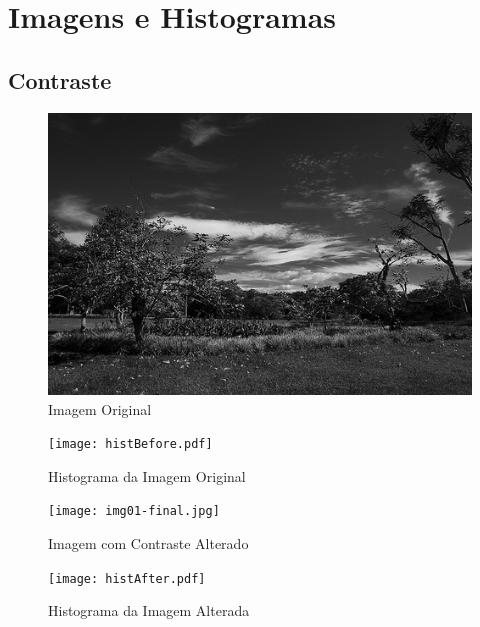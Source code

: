 \documentclass[11pt,a4paper]{article}
\begin{document}
\section{Imagens e Histogramas}
\subsection{Contraste}
\begin{figure}[!ht]
    \centering
    \includegraphics[scale=0.3]{img01.jpg}
    \caption{Imagem Original}
    \label{img1}
\end{figure}
\begin{figure}[!ht]
    \centering
    \texttt{[image: histBefore.pdf]}
    \vspace{-20pt}
    \caption{Histograma da Imagem Original}
    \label{histBefore}
\end{figure}
\begin{figure}[!ht]
    \centering
    \texttt{[image: img01-final.jpg]}
    \caption{Imagem com Contraste Alterado}
    \label{img1-f}
\end{figure}
\begin{figure}[!ht]
    \centering
    \texttt{[image: histAfter.pdf]}
    \vspace{-20pt}
    \caption{Histograma da Imagem Alterada}
    \label{histAfter}
\end{figure}
\end{document}
